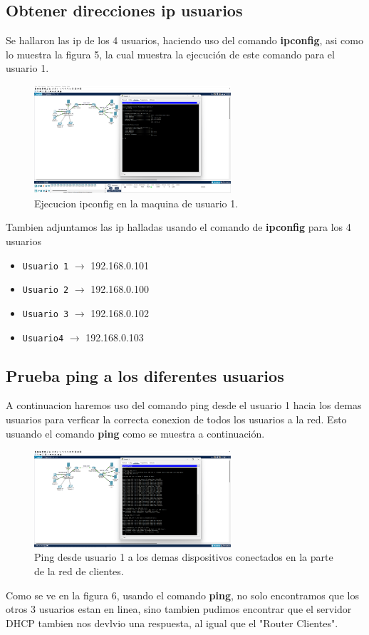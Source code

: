 \documentclass[10pt]{article}
\begin{document}
\subsection{Obtener direcciones ip usuarios}
Se hallaron las ip de los 4 usuarios, haciendo uso del comando \textbf {ipconfig}, asi como lo muestra la figura 5, la cual muestra la ejecución de este comando para el usuario 1.
\begin{figure}[H]
    \centering
    \includegraphics[width=0.65\textwidth]{lab-01-screenshots/43 ipconfig.png}
    \caption{Ejecucion ipconfig en la maquina de usuario 1.}
\end{figure}
 Tambien adjuntamos las ip halladas usando el comando de \textbf{ipconfig} para los 4 usuarios
\begin{itemize}
    \item \texttt{Usuario 1} $\rightarrow$ 192.168.0.101
    \item \texttt{Usuario 2} $\rightarrow$ 192.168.0.100
    \item \texttt{Usuario 3} $\rightarrow$ 192.168.0.102
    \item \texttt{Usuario4} $\rightarrow$ 192.168.0.103
\end{itemize}
\subsection{Prueba ping a los diferentes usuarios}
A continuacion haremos uso del comando ping desde el usuario 1 hacia los demas usuarios para verficar la correcta conexion de todos los usuarios a la red. Esto usuando el comando \textbf {ping} como se muestra a continuación.
\begin{figure}[H]
    \centering
    \includegraphics[width=0.65\textwidth]{lab-01-screenshots/43 -2-ping-local.png}
    \caption{Ping desde usuario 1 a los demas dispositivos conectados en la parte de la red de clientes.}
\end{figure}
Como se ve en la figura 6, usando el comando \textbf {ping}, no solo encontramos que los otros 3 usuarios estan en linea, sino tambien pudimos encontrar que el servidor DHCP tambien nos devlvio una respuesta, al igual que el "Router Clientes".
\end{document}
